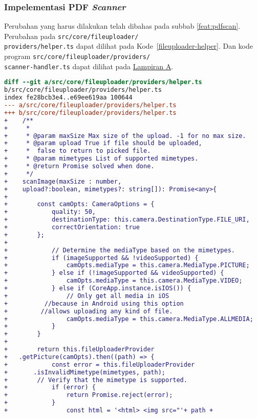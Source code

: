 \subsubsection{Impelementasi PDF \textit{Scanner}}
Perubahan yang harus dilakukan telah dibahas pada subbab \ref{feat:pdfscan}. Perubahan pada \texttt{src/core/fileuploader/\\providers/helper.ts} dapat dilihat pada \mbox{Kode \ref{fileuploader-helper}}. Dan kode program \texttt{src/core/fileuploader/providers/\\scanner-handler.ts} dapat dilihat pada \hyperref[lamp:A]{Lampiran A}.

\begin{lstlisting}[language=diff, frame=single, label ={fileuploader-helper}, caption = Perubahan pada \texttt{src/core/fileuploader/providers/helper.ts} ]
diff --git a/src/core/fileuploader/providers/helper.ts 
b/src/core/fileuploader/providers/helper.ts
index fe28bcb3e4..e69ee619aa 100644
--- a/src/core/fileuploader/providers/helper.ts
+++ b/src/core/fileuploader/providers/helper.ts
+    /**
+     * 
+     * @param maxSize Max size of the upload. -1 for no max size.
+     * @param upload True if file should be uploaded,
+     *  false to return to picked file.
+     * @param mimetypes List of supported mimetypes.  
+     * @return Promise solved when done.
+     */
+    scanImage(maxSize : number,
+    upload?:boolean, mimetypes?: string[]): Promise<any>{
+
+        const camOpts: CameraOptions = {
+            quality: 50,
+            destinationType: this.camera.DestinationType.FILE_URI,
+            correctOrientation: true
+        };
+
+            // Determine the mediaType based on the mimetypes.
+            if (imageSupported && !videoSupported) {
+                camOpts.mediaType = this.camera.MediaType.PICTURE;
+            } else if (!imageSupported && videoSupported) {
+                camOpts.mediaType = this.camera.MediaType.VIDEO;
+            } else if (CoreApp.instance.isIOS()) {
+                // Only get all media in iOS 
+	       //because in Android using this option 
+	      //allows uploading any kind of file.
+                camOpts.mediaType = this.camera.MediaType.ALLMEDIA;
+            }
+        }
+
+        return this.fileUploaderProvider
+	.getPicture(camOpts).then((path) => {
+            const error = this.fileUploaderProvider
+	    .isInvalidMimetype(mimetypes, path); 
+	     // Verify that the mimetype is supported.
+            if (error) {
+                return Promise.reject(error);
+            }
+                const html = '<html> <img src="'+ path +

\end{lstlisting}
